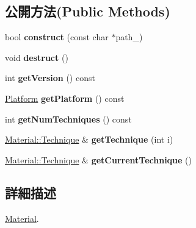 \subsection*{公開方法(Public Methods)}
\begin{DoxyCompactItemize}
\item 
bool {\bfseries construct} (const char $\ast$path\+\_\+)\hypertarget{class_i_dream_sky_1_1_material_a68761ba4f4298e8f3bd7a9a84e24eb32}{}\label{class_i_dream_sky_1_1_material_a68761ba4f4298e8f3bd7a9a84e24eb32}

\item 
void {\bfseries destruct} ()\hypertarget{class_i_dream_sky_1_1_material_a6e088d94c4822926821eee26de4d6ff6}{}\label{class_i_dream_sky_1_1_material_a6e088d94c4822926821eee26de4d6ff6}

\item 
int {\bfseries get\+Version} () const \hypertarget{class_i_dream_sky_1_1_material_a6e6304a6b45be279b3cc078d396c347d}{}\label{class_i_dream_sky_1_1_material_a6e6304a6b45be279b3cc078d396c347d}

\item 
\hyperlink{class_i_dream_sky_1_1_platform}{Platform} {\bfseries get\+Platform} () const \hypertarget{class_i_dream_sky_1_1_material_afb9f1bf9e737cafd5ff65c668fd8ce13}{}\label{class_i_dream_sky_1_1_material_afb9f1bf9e737cafd5ff65c668fd8ce13}

\item 
int {\bfseries get\+Num\+Techniques} () const \hypertarget{class_i_dream_sky_1_1_material_a5a6402d3ceb58b46dfdab6693642addc}{}\label{class_i_dream_sky_1_1_material_a5a6402d3ceb58b46dfdab6693642addc}

\item 
\hyperlink{class_i_dream_sky_1_1_material_1_1_technique}{Material\+::\+Technique} \& {\bfseries get\+Technique} (int i)\hypertarget{class_i_dream_sky_1_1_material_a6d8d5671d038ff7a3b0385f28aeb384d}{}\label{class_i_dream_sky_1_1_material_a6d8d5671d038ff7a3b0385f28aeb384d}

\item 
\hyperlink{class_i_dream_sky_1_1_material_1_1_technique}{Material\+::\+Technique} \& {\bfseries get\+Current\+Technique} ()\hypertarget{class_i_dream_sky_1_1_material_afd6262f343c74ce6c4e3af67e4e58ddb}{}\label{class_i_dream_sky_1_1_material_afd6262f343c74ce6c4e3af67e4e58ddb}

\end{DoxyCompactItemize}


\subsection{詳細描述}
\hyperlink{class_i_dream_sky_1_1_material}{Material}. 

